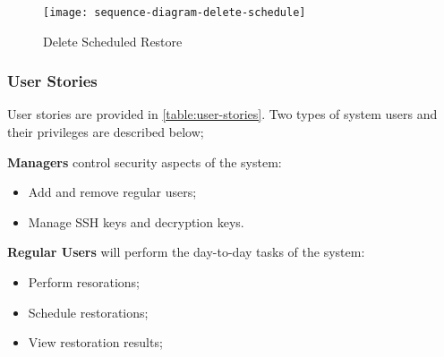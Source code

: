 		\begin{figure}[H]
			\setlength{\belowcaptionskip}{15pt plus 3pt minus 2pt}
			\caption{Delete Scheduled Restore}
			\centering
			\texttt{[image: sequence-diagram-delete-schedule]}
			\label{fig:seq-delete-restore}
		\end{figure}
	
	\subsubsection{User Stories} \label{user-stories}
   
		User stories are provided in \autoref{table:user-stories}. Two types of system users and their privileges are described below;
		
		\textbf{Managers} control security aspects of the system:
		\begin{itemize}
			\item Add and remove regular users;
			\item Manage SSH keys and decryption keys.
		\end{itemize}
		\textbf{Regular Users} will perform the day-to-day tasks of the system:
		\begin{itemize}
			\item Perform resorations;
			\item Schedule restorations;
			\item View restoration results;
		\end{itemize}
		
